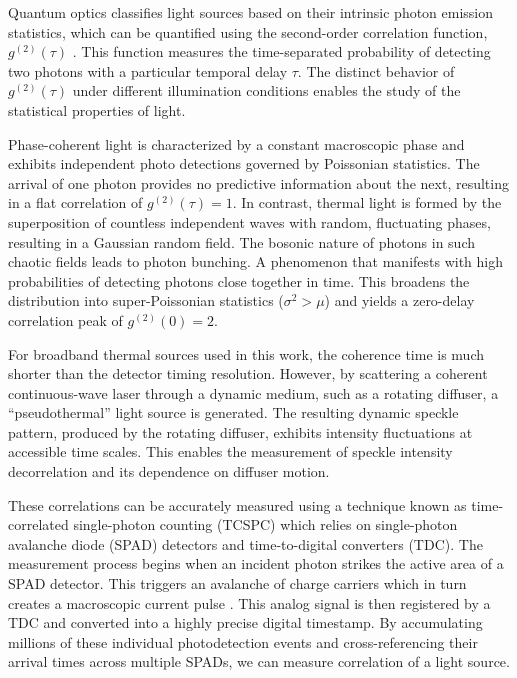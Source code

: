 Quantum optics classifies light sources based on their intrinsic photon emission statistics, which can be quantified using the second-order correlation function, $g^{(2)}(\tau)$ \cite{glauber1963quantum}.
This function measures the time-separated probability of detecting two photons with a particular temporal delay $\tau$. 
The distinct behavior of $g^{(2)}(\tau)$ under different illumination conditions enables the study of the statistical properties of light. 


Phase-coherent light is characterized by a constant macroscopic phase and exhibits independent photo detections governed by Poissonian statistics.
The arrival of one photon provides no predictive information about the next, resulting in a flat correlation of $g^{(2)}(\tau)=1$. 
In contrast, thermal light is formed by the superposition of countless independent waves with random, fluctuating phases, resulting in a Gaussian random field. 
The bosonic nature of photons in such chaotic fields leads to photon bunching. 
A phenomenon that manifests with high probabilities of detecting photons close together in time. 
This broadens the distribution into super-Poissonian statistics ($\sigma^2>\mu$) and yields a zero-delay correlation peak of $g^{(2)}(0)=2$.


For broadband thermal sources used in this work, the coherence time is much shorter than the detector timing resolution.
However, by scattering a coherent continuous-wave laser through a dynamic medium, such as a rotating diffuser, a ``pseudothermal'' light source is generated. 
The resulting dynamic speckle pattern, produced by the rotating diffuser, exhibits intensity fluctuations at accessible time scales. 
This enables the measurement of speckle intensity decorrelation and its dependence on diffuser motion.


These correlations can be accurately measured using a technique known as time-correlated single-photon counting (TCSPC) which relies on single-photon avalanche diode (SPAD) detectors and time-to-digital converters (TDC). 
The measurement process begins when an incident photon strikes the active area of a SPAD detector. This triggers an avalanche of charge carriers which in turn creates a macroscopic current pulse \cite{charbon2014single, antolovic2018dynamic, hofbauer2018temperature}. 
This analog signal is then registered by a TDC and converted into a highly precise digital timestamp.
By accumulating millions of these individual photodetection events and cross-referencing their arrival times across multiple SPADs, we can measure correlation of a light source. 


